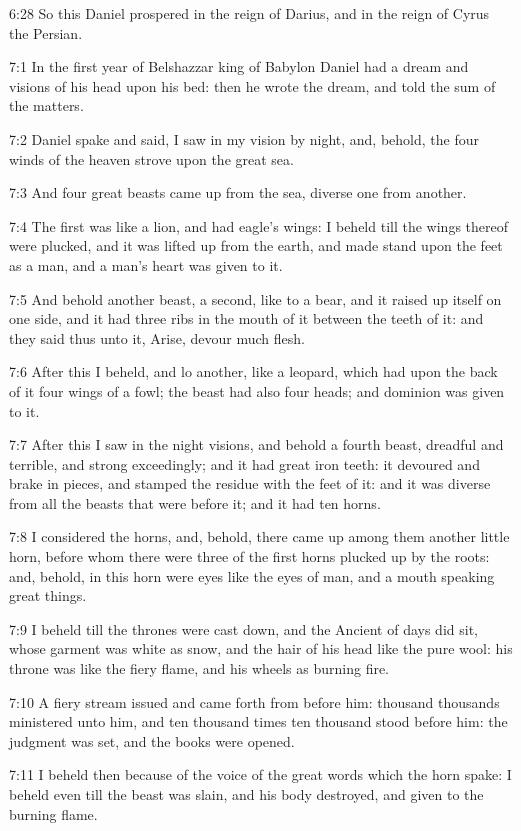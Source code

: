 6:28 So this Daniel prospered in the reign of Darius, and in the reign
of Cyrus the Persian.

7:1 In the first year of Belshazzar king of Babylon Daniel had a dream
and visions of his head upon his bed: then he wrote the dream, and
told the sum of the matters.

7:2 Daniel spake and said, I saw in my vision by night, and, behold,
the four winds of the heaven strove upon the great sea.

7:3 And four great beasts came up from the sea, diverse one from
another.

7:4 The first was like a lion, and had eagle's wings: I beheld till
the wings thereof were plucked, and it was lifted up from the earth,
and made stand upon the feet as a man, and a man's heart was given to
it.

7:5 And behold another beast, a second, like to a bear, and it raised
up itself on one side, and it had three ribs in the mouth of it
between the teeth of it: and they said thus unto it, Arise, devour
much flesh.

7:6 After this I beheld, and lo another, like a leopard, which had
upon the back of it four wings of a fowl; the beast had also four
heads; and dominion was given to it.

7:7 After this I saw in the night visions, and behold a fourth beast,
dreadful and terrible, and strong exceedingly; and it had great iron
teeth: it devoured and brake in pieces, and stamped the residue with
the feet of it: and it was diverse from all the beasts that were
before it; and it had ten horns.

7:8 I considered the horns, and, behold, there came up among them
another little horn, before whom there were three of the first horns
plucked up by the roots: and, behold, in this horn were eyes like the
eyes of man, and a mouth speaking great things.

7:9 I beheld till the thrones were cast down, and the Ancient of days
did sit, whose garment was white as snow, and the hair of his head
like the pure wool: his throne was like the fiery flame, and his
wheels as burning fire.

7:10 A fiery stream issued and came forth from before him: thousand
thousands ministered unto him, and ten thousand times ten thousand
stood before him: the judgment was set, and the books were opened.

7:11 I beheld then because of the voice of the great words which the
horn spake: I beheld even till the beast was slain, and his body
destroyed, and given to the burning flame.

